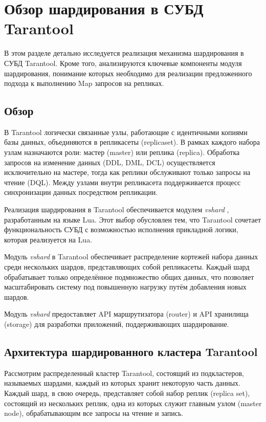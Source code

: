 \section{Обзор шардирования в СУБД Tarantool}

В этом разделе детально исследуется реализация механизма шардирования в СУБД
Tarantool. Кроме того, анализируются ключевые компоненты модуля шардирования,
понимание которых необходимо для реализации предложенного подхода к выполнению
Map запросов на репликах.

\subsection{Обзор}

В Tarantool логически связанные узлы, работающие с идентичными копиями базы
данных, объединяются в репликасеты (replicaset). В рамках каждого набора узлам
назначаются роли: мастер (master) или реплика (replica). Обработка запросов
на изменение данных (DDL, DML, DCL) осуществляется исключительно на мастере,
тогда как реплики обслуживают только запросы на чтение (DQL). Между узлами
внутри репликасета поддерживается процесс синхронизации данных посредством
репликации.

Реализация шардирования в Tarantool обеспечивается модулем \textit{vshard}
\cite{VshardGithub}, разработанным на языке Lua. Этот выбор обусловлен тем, что
Tarantool сочетает функциональность СУБД с возможностью исполнения прикладной
логики, которая реализуется на Lua.

Модуль \textit{vshard} в Tarantool обеспечивает распределение кортежей набора
данных среди нескольких шардов, представляющих собой репликасеты. Каждый шард
обрабатывает только определённое подмножество общих данных, что позволяет
масштабировать систему под повышенную нагрузку путём добавления новых шардов.

Модуль \textit{vshard} предоставляет API маршрутизатора (router) и
API хранилища (storage) для разработки приложений, поддерживающих
шардирование.

\subsection{Архитектура шардированного кластера Tarantool}

Рассмотрим распределенный кластер Tarantool, состоящий из подкластеров,
называемых шардами, каждый из которых хранит некоторую часть данных. Каждый
шард, в свою очередь, представляет собой набор реплик (replica set), состоящий
из нескольких реплик, одна из которых служит главным узлом (master node),
обрабатывающим все запросы на чтение и запись.

